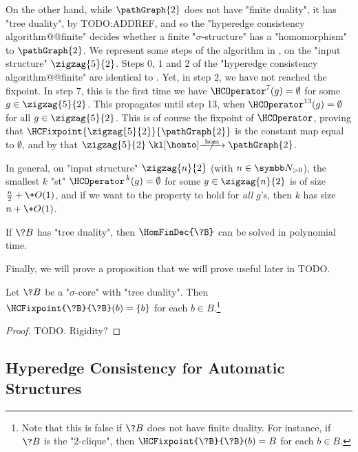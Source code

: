 \begin{example}
	\AP\label{ex:zigzag-HC-P2}
	On the other hand, while $\pathGraph{2}$ does not have "finite duality", it has
	"tree duality", by TODO:ADDREF, and so the "hyperedge consistency algorithm@@finite"
	decides whether a finite "$\sigma$-structure" has a "homomorphism" to $\pathGraph{2}$.
	We represent some steps of the algorithm in ,
	on the "input structure" $\zigzag{5}{2}$.
	Steps $0$, $1$ and $2$ of the "hyperedge consistency algorithm@@finite"
	are identical to .
	Yet, in step $2$, we have not reached the fixpoint.
	In step $7$, this is the first time
	we have $\HCOperator^{7}(g) = \emptyset$ for some
	$g\in \zigzag{5}{2}$. This propagates until step 13, 
	when $\HCOperator^{13}(g) = \emptyset$
	for all $g\in \zigzag{5}{2}$. This is of course the fixpoint of $\HCOperator$,
	proving that $\HCFixpoint{\zigzag{5}{2}}{\pathGraph{2}}$ is the constant map
	equal to $\emptyset$, and by 
	that $\zigzag{5}{2} \nothomto \pathGraph{2}$.

	In general, on "input structure" $\zigzag{n}{2}$ (with $n\in\Np$),
	the smallest $k$ "st" $\HCOperator^{\,k}(g) = \emptyset$
	for some $g \in \zigzag{n}{2}$ is of size $\frac{n}{2} + \+O(1)$,
	and if we want to the property to hold for \emph{all} $g$'s,
	then $k$ has size $n + \+O(1)$.
\end{example}

\begin{corollary}
	If $\?B$ has "tree duality", then $\HomFinDec{\?B}$ can be solved in
	polynomial time.
\end{corollary}

Finally, we will prove a proposition that we will prove useful later in TODO.
\begin{proposition}
	\AP\label{prop:HC-on-same-structure}
	Let $\?B$ be a "$\sigma$-core" with "tree duality". Then
	$\HCFixpoint{\?B}{\?B}(b) = \{b\}$ for each $b\in B$.\footnote{Note that
	this is false if $\?B$ does not have finite duality. For instance,
	if $\?B$ is the "$2$-clique", then $\HCFixpoint{\?B}{\?B}(b) = B$
	for each $b \in B$.}
\end{proposition}
\begin{proof}
	TODO. Rigidity?
\end{proof}

\subsection{\AP\label{sec:hyperedge-consistency-automatic}%
	Hyperedge Consistency for Automatic Structures}

